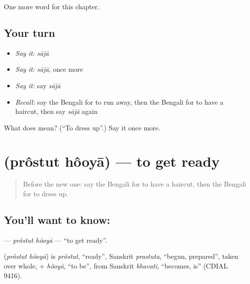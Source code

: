 \begin{grammarlens}[title={What you've built}]
One more word for this chapter.
\end{grammarlens}

\subsection*{Your turn}
\begin{itemize}
\raggedright
  \item \emph{Say it:} \emph{sājā}
  \item \emph{Say it:} \emph{sājā}, once more
  \item \emph{Say it:} say \emph{sājā}
  \item \emph{Recall:} say the Bengali for to run away, then the Bengali for to have a haircut, then say \emph{sājā} again
\end{itemize}

\begin{tcolorbox}[breakable,colback=teal!4,colframe=teal!35!black,title={Before you move on}]
What does  mean? (\textquotedblleft{}To dress up\textquotedblright{}.) Say it once more.
\end{tcolorbox}
\section[\texorpdfstring{\bn{প্রস্তুত} \bn{হওয়া} (prôstut hôoyā)}{প্রস্তুত হওয়া (prôstut hôoyā)}]{  (prôstut hôoyā) — to get ready}

\label{lesson:BN-C213-prostut-hooya}



\begin{quote}
Before the new one: say the Bengali for to have a haircut, then the Bengali for to dress up.
\end{quote}

\subsection*{You'll want to know:  }
\textbf{ } — \emph{prôstut hôoyā} — \textquotedblleft{}to get ready\textquotedblright{}.

\begin{cousinweb}
\textbf{ } (\emph{prôstut hôoyā}) is \emph{prôstut}, \textquotedblleft{}ready\textquotedblright{}, Sanskrit \emph{prastuta}, \textquotedblleft{}begun, prepared\textquotedblright{}, taken over whole, + \emph{hôoyā}, \textquotedblleft{}to be\textquotedblright{}, from Sanskrit \emph{bhavati}, \textquotedblleft{}becomes, is\textquotedblright{} (CDIAL 9416).
\end{cousinweb}

